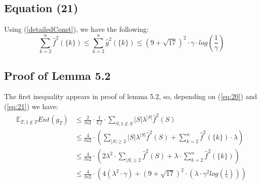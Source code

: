 \documentclass{article}
\begin{document}
		\subsection{Equation (21)}
			Using (\ref{detailedConst}), we have the following:
			\begin{equation} \label{eq:21}
				\sum_{k=2}^n \hat{f}^2 \left( \{k\} \right) 
				\leq \sum_{k=2}^n \hat{g}^2 \left( \{k\} \right) 
				\leq \left( 9 + \sqrt{17} \right) ^ 2 \cdot \gamma \cdot log \left( \frac{1}{\gamma} \right)
			\end{equation}
	
		\subsection{Proof of Lemma 5.2}
			The first inequality appears in proof of lemma 5.2, so, depending on (\ref{eq:20}) and (\ref{eq:21}) we have:
			\begin{equation} \label{lemma5:2}\begin{aligned}
				\mathbb{E}_{T, 1 \notin T} Ent(g_T)
				& \leq \frac{2}{ln2} \cdot \frac{1}{\mathbb{E} f} \cdot \sum_{S, 1 \notin S} |S| \lambda^{|S|} \hat{f}^2(S) \\
				& \leq \frac{4}{ln2} \cdot \left( \sum_{|S| \geq 2} |S| \lambda^{|S|} \hat{f}^2(S) + \sum_{k=2}^n \hat{f}^2 \left( \{k\} \right) \cdot \lambda \right) \\
				& \leq \frac{4}{ln2}  \cdot \left( 2 \lambda^2 \cdot \sum_{|S| \geq 2} \hat{f}^2(S) + \lambda \cdot \sum_{k=2}^n \hat{f}^2 \left( \{k\} \right) \right) \\
				& \leq \frac{4}{ln2} \cdot \left( 4 ( \lambda^2 \cdot \gamma ) + \left( 9 + \sqrt{17} \right)^2 \cdot \left( \lambda \cdot \gamma^2 log \left( \frac{1}{\gamma} \right) \right) \right)
			\end{aligned}
			\end{equation}
			
\end{document}
